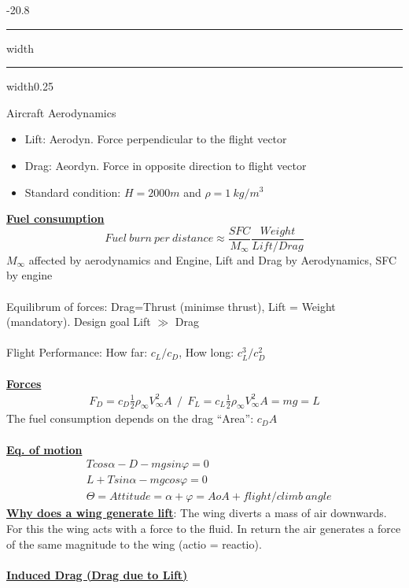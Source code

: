 \documentclass[9pt, landscape, fleqn]{scrartcl}
\makeatletter
\renewcommand{\section}{\@startsection{section}{1}{0mm}%
{-2\baselineskip}{0.8\baselineskip}%
{\hrule depth 0.2pt width\columnwidth\hrule depth1.5pt
width0.25\columnwidth\vspace*{1.2em}\Large\bfseries\rmfamily}}
\makeatother
\begin{document}
\begin{multicols*}{3}
\section{Aircraft Aerodynamics}
\begin{itemize}
    \item Lift: Aerodyn. Force perpendicular to the flight vector
    \item Drag: Aeordyn. Force in opposite direction to flight vector
\end{itemize}
\begin{itemize}
    \item Standard condition: $H = 2000 m$ and $\rho = 1~kg/m^3$
\end{itemize}
\underline{\textbf{Fuel consumption}}
\begin{equation*}
    Fuel~burn~per~distance \approx \frac{SFC}{M_\infty} \frac{Weight}{Lift/Drag}
\end{equation*}
$M_\infty$ affected by aerodynamics and Engine, Lift and Drag by Aerodynamics, SFC by engine \\ \\
Equilibrum of forces: Drag=Thrust (minimse thrust), Lift = Weight (mandatory). Design goal Lift $\gg$ Drag \\ \\ Flight Performance: How far: $c_L/c_D$, How long: $c_L^3 / c_D^2$ \\ \\
\underline{\textbf{Forces}}
\begin{align*}
    F_D = c_D \frac{1}{2}\rho_\infty V_\infty^2 A~~/~~F_L = c_L \frac{1}{2}\rho_\infty V_\infty^2 A = mg = L
\end{align*}
The fuel consumption depends on the drag ``Area'': $c_D A$ \\ \\
\underline{\textbf{Eq. of motion}}
\begin{align*}
    &T cos\alpha - D - mg sin\varphi = 0 \\
    &L + T sin\alpha - mg cos \varphi = 0 \\
    &\Theta = Attitude = \alpha + \varphi = AoA + flight/climb~angle  
\end{align*}
\underline{\textbf{Why does a wing generate lift}}: The wing diverts a mass of air downwards. For this the wing acts with a force to the fluid. In return the air generates a force of the same magnitude to the wing (actio = reactio). \\ \\
\underline{\textbf{Induced Drag (Drag due to Lift)}}

\end{multicols*}
\end{document}
